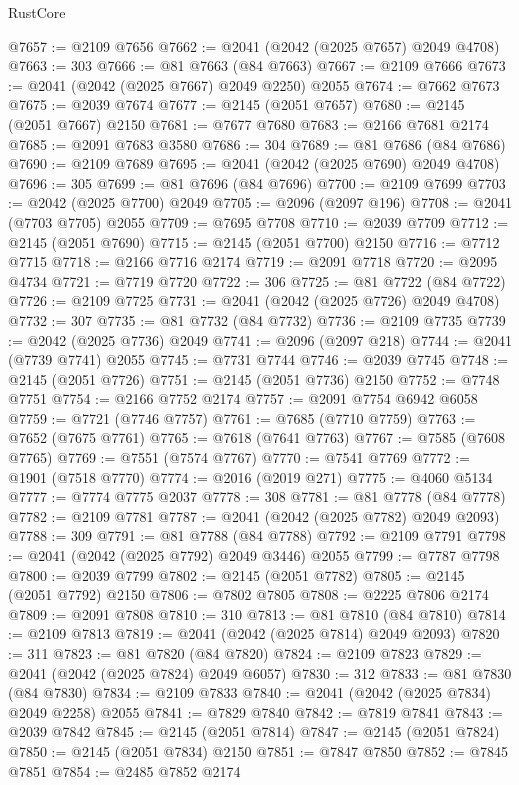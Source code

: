 \begin{lexlean}{RustCore}
\begin{coremodule}
@7657 := @2109 @7656
@7662 := @2041 (@2042 (@2025 @7657) @2049 @4708)
@7663 := 303
@7666 := @81 @7663 (@84 @7663)
@7667 := @2109 @7666
@7673 := @2041 (@2042 (@2025 @7667) @2049 @2250) @2055
@7674 := @7662 @7673
@7675 := @2039 @7674
@7677 := @2145 (@2051 @7657)
@7680 := @2145 (@2051 @7667) @2150
@7681 := @7677 @7680
@7683 := @2166 @7681 @2174
@7685 := @2091 @7683 @3580
@7686 := 304
@7689 := @81 @7686 (@84 @7686)
@7690 := @2109 @7689
@7695 := @2041 (@2042 (@2025 @7690) @2049 @4708)
@7696 := 305
@7699 := @81 @7696 (@84 @7696)
@7700 := @2109 @7699
@7703 := @2042 (@2025 @7700) @2049
@7705 := @2096 (@2097 @196)
@7708 := @2041 (@7703 @7705) @2055
@7709 := @7695 @7708
@7710 := @2039 @7709
@7712 := @2145 (@2051 @7690)
@7715 := @2145 (@2051 @7700) @2150
@7716 := @7712 @7715
@7718 := @2166 @7716 @2174
@7719 := @2091 @7718
@7720 := @2095 @4734
@7721 := @7719 @7720
@7722 := 306
@7725 := @81 @7722 (@84 @7722)
@7726 := @2109 @7725
@7731 := @2041 (@2042 (@2025 @7726) @2049 @4708)
@7732 := 307
@7735 := @81 @7732 (@84 @7732)
@7736 := @2109 @7735
@7739 := @2042 (@2025 @7736) @2049
@7741 := @2096 (@2097 @218)
@7744 := @2041 (@7739 @7741) @2055
@7745 := @7731 @7744
@7746 := @2039 @7745
@7748 := @2145 (@2051 @7726)
@7751 := @2145 (@2051 @7736) @2150
@7752 := @7748 @7751
@7754 := @2166 @7752 @2174
@7757 := @2091 @7754 @6942 @6058
@7759 := @7721 (@7746 @7757)
@7761 := @7685 (@7710 @7759)
@7763 := @7652 (@7675 @7761)
@7765 := @7618 (@7641 @7763)
@7767 := @7585 (@7608 @7765)
@7769 := @7551 (@7574 @7767)
@7770 := @7541 @7769
@7772 := @1901 (@7518 @7770)
@7774 := @2016 (@2019 @271)
@7775 := @4060 @5134
@7777 := @7774 @7775 @2037
@7778 := 308
@7781 := @81 @7778 (@84 @7778)
@7782 := @2109 @7781
@7787 := @2041 (@2042 (@2025 @7782) @2049 @2093)
@7788 := 309
@7791 := @81 @7788 (@84 @7788)
@7792 := @2109 @7791
@7798 := @2041 (@2042 (@2025 @7792) @2049 @3446) @2055
@7799 := @7787 @7798
@7800 := @2039 @7799
@7802 := @2145 (@2051 @7782)
@7805 := @2145 (@2051 @7792) @2150
@7806 := @7802 @7805
@7808 := @2225 @7806 @2174
@7809 := @2091 @7808
@7810 := 310
@7813 := @81 @7810 (@84 @7810)
@7814 := @2109 @7813
@7819 := @2041 (@2042 (@2025 @7814) @2049 @2093)
@7820 := 311
@7823 := @81 @7820 (@84 @7820)
@7824 := @2109 @7823
@7829 := @2041 (@2042 (@2025 @7824) @2049 @6057)
@7830 := 312
@7833 := @81 @7830 (@84 @7830)
@7834 := @2109 @7833
@7840 := @2041 (@2042 (@2025 @7834) @2049 @2258) @2055
@7841 := @7829 @7840
@7842 := @7819 @7841
@7843 := @2039 @7842
@7845 := @2145 (@2051 @7814)
@7847 := @2145 (@2051 @7824)
@7850 := @2145 (@2051 @7834) @2150
@7851 := @7847 @7850
@7852 := @7845 @7851
@7854 := @2485 @7852 @2174

\end{coremodule}
\end{lexlean}
